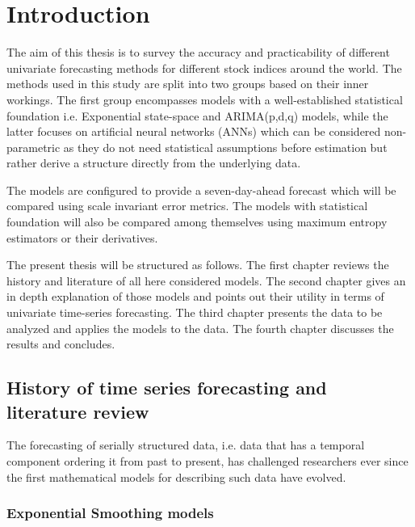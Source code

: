 
\chapter{Introduction}
\label{Chapter1}

The aim of this thesis is to survey the accuracy and practicability of different univariate forecasting methods for different stock indices around the world. The methods used in this study are split into two groups based on their inner workings. The first group encompasses models with a well-established statistical foundation i.e. Exponential state-space and ARIMA(p,d,q) models, while the latter focuses on artificial neural networks (ANNs) which can be considered non-parametric as they do not need statistical assumptions before estimation but rather derive a structure directly from the underlying data. 

The models are configured to provide a seven-day-ahead forecast which will be compared using scale invariant error metrics. The models with statistical foundation will also be compared among themselves using maximum entropy estimators or their derivatives.

The present thesis will be structured as follows. The first chapter reviews the history and literature of all here considered models. The second chapter gives an in depth explanation of those models and points out their utility in terms of univariate time-series forecasting. The third chapter presents the data to be analyzed and applies the models to the data. The fourth chapter discusses the results and concludes.


\section{History of time series forecasting and literature review}

The forecasting of serially structured data, i.e. data that has a temporal component ordering it from past to present, has challenged researchers ever since the first mathematical models for describing such data have evolved. 


\subsection*{Exponential Smoothing models}

